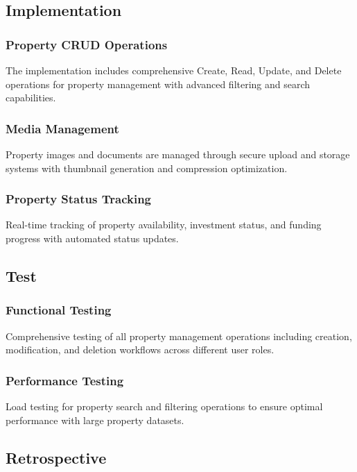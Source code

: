 
\subsection{Implementation}
\subsubsection{Property CRUD Operations}
The implementation includes comprehensive Create, Read, Update, and Delete operations for property management with advanced filtering and search capabilities.

\subsubsection{Media Management}
Property images and documents are managed through secure upload and storage systems with thumbnail generation and compression optimization.

\subsubsection{Property Status Tracking}
Real-time tracking of property availability, investment status, and funding progress with automated status updates.

\subsection{Test}
\subsubsection{Functional Testing}
Comprehensive testing of all property management operations including creation, modification, and deletion workflows across different user roles.

\subsubsection{Performance Testing}
Load testing for property search and filtering operations to ensure optimal performance with large property datasets.

\subsection{Retrospective}

